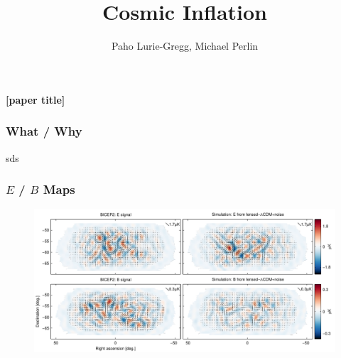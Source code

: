 \documentclass[]{beamer}
\title{Cosmic Inflation}
\author{Paho Lurie-Gregg, Michael Perlin}
\date{}
\renewcommand{\red}[1]{{\bf \color{red} #1}}
\newcommand{\fixme}[1]{\red{[#1]}}
\begin{document}
\begin{frame}
  \maketitle
  \begin{center}
    \fixme{paper title}
    \vspace{1.5in}
  \end{center}

\end{frame}


\begin{frame}
  \frametitle{What / Why}
  sds
\end{frame}

\begin{frame}
  \frametitle{$E$ / $B$ Maps}
  \begin{figure}
    \centering
    \includegraphics[width=\columnwidth]{eb_maps}
  \end{figure}
\end{frame}
\end{document}
